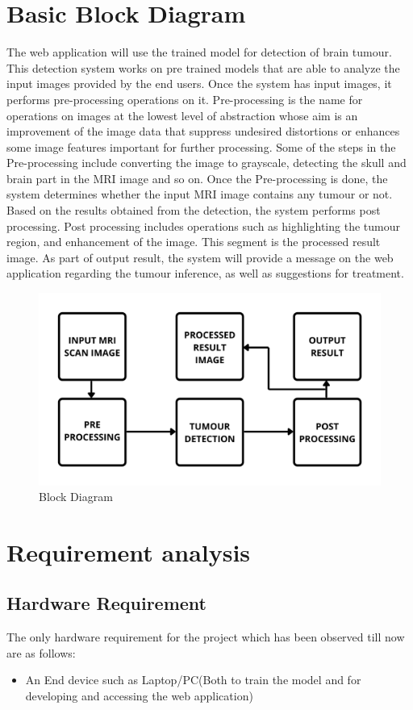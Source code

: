 \section{Basic Block Diagram}
The web application will use the trained model for detection of brain tumour. This detection system works on pre trained models that are able to analyze the input images provided by the end users. Once the system has input images, it performs pre-processing operations on it. Pre-processing is the name for operations on images at the lowest level of abstraction whose aim is an improvement of the image data that suppress undesired distortions or enhances some image features important for further processing. Some of the steps in the Pre-processing include converting the image to grayscale, detecting the skull and brain part in the MRI image and so on. Once the Pre-processing is done, the system determines whether the input MRI image contains any tumour or not. Based on the results obtained from the detection, the system performs post processing. Post processing includes operations such as highlighting the tumour region, and enhancement of the image. This segment is the processed result image. As part of output result, the system will provide a message on the web application regarding the tumour inference, as well as suggestions for treatment.
\begin{figure}[H]
\includegraphics[scale=0.2]{Photos/blockdiagram.png}
\caption{Block Diagram} \label{fig:ishan}
\end{figure}
\section{Requirement analysis}
\subsection{Hardware Requirement}
The only hardware requirement for the project which has been observed till now are as follows:
\begin{itemize}
    \item An End device such as Laptop/PC(Both to train the model and for developing and accessing the web application)
\end{itemize}
